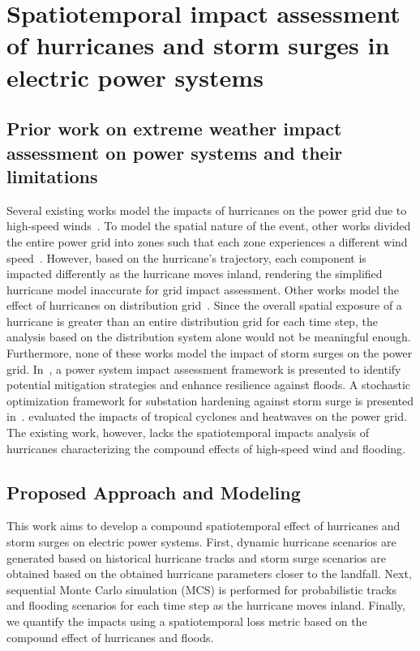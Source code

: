 \documentclass[hidelinks, 12pt]{article}
\begin{document}
\clearpage
\section{Spatiotemporal impact assessment of hurricanes and storm surges in electric power systems}
\subsection{Prior work on extreme weather impact assessment on power systems and their limitations}
Several existing works model the impacts of hurricanes on the power grid due to high-speed winds~\cite{7434044}. To model the spatial nature of the event, other works divided the entire power grid into zones such that each zone experiences a different wind speed~\cite{Trakas2018}. However, based on the hurricane's trajectory, each component is impacted differently as the hurricane moves inland, rendering the simplified hurricane model inaccurate for grid impact assessment. Other works model the effect of hurricanes on distribution grid~\cite{nguyen2019assessing}. Since the overall spatial exposure of a hurricane is greater than an entire distribution grid for each time step, the analysis based on the distribution system alone would not be meaningful enough.
Furthermore, none of these works model the impact of storm surges on the power grid. In~\cite{souto2022power}, a power system impact assessment framework is presented to identify potential mitigation strategies and enhance resilience against floods. A stochastic optimization framework for substation hardening against storm surge is presented in~\cite{shukla2021scenario}. \cite{Feng2022} evaluated the impacts of tropical cyclones and heatwaves on the power grid. The existing work, however, lacks the spatiotemporal impacts analysis of hurricanes characterizing the compound effects of high-speed wind and flooding. 

\subsection{Proposed Approach and Modeling}
This work aims to develop a compound spatiotemporal effect of hurricanes and storm surges on electric power systems. First, dynamic hurricane scenarios are generated based on historical hurricane tracks and storm surge scenarios are obtained based on the obtained hurricane parameters closer to the landfall. Next, sequential Monte Carlo simulation (MCS) is performed for probabilistic tracks and flooding scenarios for each time step as the hurricane moves inland. Finally, we quantify the impacts using a spatiotemporal loss metric based on the compound effect of hurricanes and floods.
\end{document}
